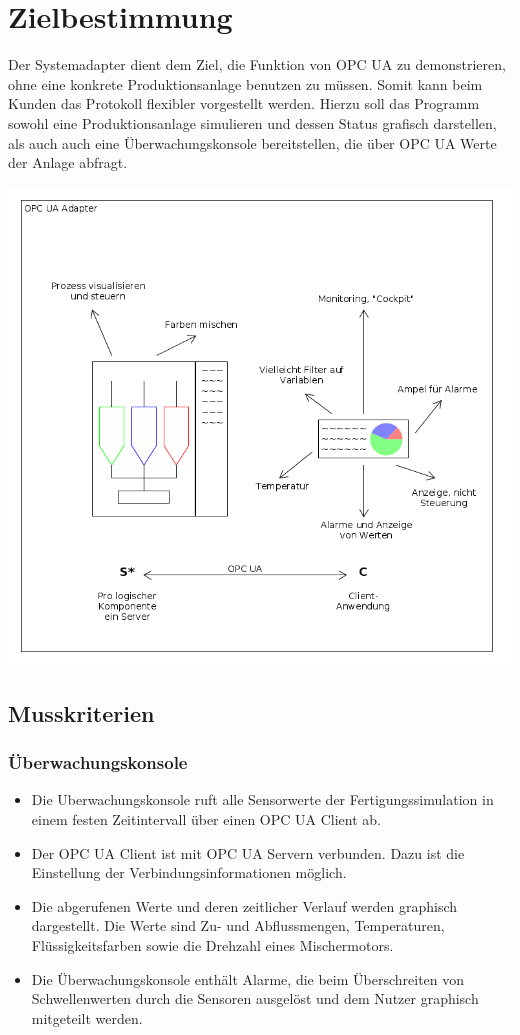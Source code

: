 \documentclass[parskip=full]{scrartcl}
\begin{document}
\section{Zielbestimmung}
Der \gls{Systemadapter} dient dem Ziel, die Funktion von \gls{OPC UA} zu demonstrieren, ohne eine konkrete \gls{Produktionsanlage}
benutzen zu müssen. Somit kann beim Kunden das Protokoll flexibler vorgestellt werden. Hierzu soll das Programm
sowohl eine \gls{Produktionsanlage} simulieren und dessen Status grafisch darstellen, als auch auch eine Überwachungskonsole
bereitstellen, die über OPC UA Werte der Anlage abfragt.\\
\begin{center}
    \includegraphics[scale=0.5]{../system-sketch.png}
\end{center}
\subsection{Musskriterien}
\subsubsection{Überwachungskonsole}
\begin{itemize}
\item Die \gls{Uberwachungskonsole} ruft alle Sensorwerte der Fertigungssimulation in einem festen Zeitintervall über einen OPC UA Client ab.
\item Der OPC UA Client ist mit OPC UA Servern verbunden. Dazu ist die Einstellung der Verbindungsinformationen möglich.
\item Die abgerufenen Werte und deren zeitlicher Verlauf werden graphisch dargestellt. Die Werte sind Zu- und Abflussmengen, Temperaturen, Flüssigkeitsfarben sowie die Drehzahl eines Mischermotors.
\item Die Überwachungskonsole enthält Alarme, die beim Überschreiten von Schwellenwerten durch die Sensoren ausgelöst und dem Nutzer graphisch mitgeteilt werden.
\end{itemize}
\end{document}

